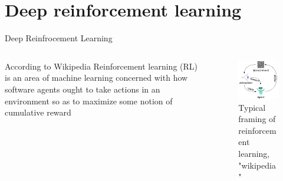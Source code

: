 \documentclass{beamer}
\begin{document}
\section{Deep reinforcement learning}
\begin{frame}{Deep Reinfrocement Learning}
\begin{columns}
\begin{column}{0.5\textwidth}
\begin{block}{According to Wikipedia}
Reinforcement learning (RL) is an area of machine learning concerned with how software agents ought to take actions in an environment so as to maximize some notion of cumulative reward
\end{block}
\end{column}

\begin{column}{0.5\textwidth}
\begin{center}

\begin{figure}

\includegraphics[scale=0.3]{figs/img/reinforcementLearning.png}
\caption{Typical framing of reinforcement learning, "wikipedia"}
\end{figure}
\end{center}

\end{column}

\end{columns}

\end{frame}
\end{document}
